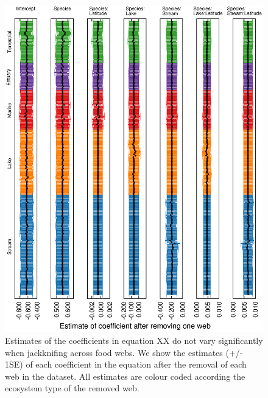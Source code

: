 \documentclass[12pt]{article}
\begin{document}
    \begin{figure}[h]
    \centerline{\includegraphics*[width=.8\textwidth]{Figures/Jackknife/Gen_web.eps}}
    \caption{Estimates of the coefficients in equation XX do not vary significantly
    when jackknifing across food webs. We show the estimates (+/- 1SE) of each coefficient
    in the equation after the removal of each web in the dataset. All estimates are colour
    coded according the ecosystem type of the removed web.}
    \label{Gen_web}
    \end{figure}
\end{document}
